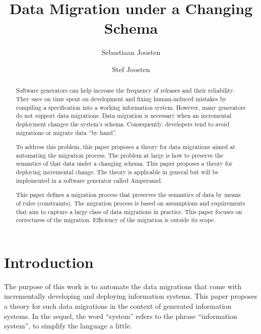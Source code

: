 \documentclass[runningheads]{llncs}
\begin{document}
%

\title{Data Migration under a Changing Schema}
%
%
\author{Sebastiaan Joosten\\ \and
Stef Joosten}
%
%
%
\maketitle              %
%
\begin{abstract}
Software generators can help increase the frequency of releases and their reliability.
They save on time spent on development and fixing human-induced mistakes by compiling a specification into a working information system.
However, many generators do not support data migrations.
Data migration is necessary when an incremental deployment changes the system's schema.
Consequently, developers tend to avoid migrations or migrate data ``by hand''.

To address this problem, this paper proposes a theory for data migrations aimed at automating the migration process.
The problem at large is how to preserve the semantics of that data under a changing schema.
This paper proposes a theory for deploying incremental change.
The theory is applicable in general but will be implemented in a software generator called Ampersand.

This paper defines a migration process that preserves the semantics of data by means of rules (constraints).
The migration process is based on assumptions and requirements that aim to capture a large class of data migrations in practice.
This paper focuses on correctness of the migration. Efficiency of the migration is outside its scope.

\end{abstract}
%
%
%
\section{Introduction}
\label{sct:Introduction}
   The purpose of this work is to automate the data migrations that come with incrementally developing and deploying information systems.
   This paper proposes a theory for such data migrations in the context of generated information systems.
   In the sequel, the word ``system'' refers to the phrase ``information system'', to simplify the language a little.
\end{document}
